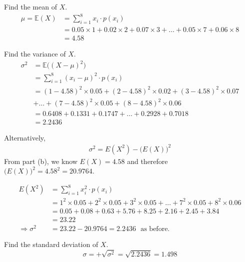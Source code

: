 \begin{example}
\begin{center}
\begin{benumerate}
\item Find the mean of $X$.
\begin{align*}
\mu = \mathbb{E}(X) &= \sum_{i=1}^{8} x_i \cdot p(x_i) \\
	&= 0.05 \times 1 + 0.02 \times 2 + 0.07 \times 3 + \hdots + 0.05 \times 7 + 0.06 \times 8 \\
	&= 4.58
\end{align*}

\item Find the variance of $X$.
\begin{align*}
\sigma^2 &= \mathbb{E} \bigg( (X-\mu)^2 \bigg) \\
		 &= \sum_{i=1}^{8} (x_i - \mu)^2 \cdot p(x_i) \\
		 &= (1-4.58)^2 \times 0.05 + (2-4.58)^2 \times 0.02 + (3 - 4.58)^2 \times 0.07 \\
		 &+ \hdots + (7-4.58)^2 \times 0.05 + (8-4.58)^2 \times 0.06 \\
		 &= 0.6408 + 0.1331 + 0.1747 + \hdots + 0.2928 + 0.7018 \\
		 &= 2.2436
\end{align*}

Alternatively,
\begin{align*}
\sigma^{2} = E(X^2) - \bigg( E(X) \bigg) ^2 
\end{align*}
From part (b), we know $E(X)=4.58$ and therefore $\bigg(E(X)\bigg)^2 = 4.58^2 = 20.9764$.

\begin{align*}
E(X^2) 	&= \sum_{i=1}^{8} x_i^2 \cdot p(x_i) \\
		&= 1^2 \times 0.05 + 2^2 \times 0.05 + 3^2 \times 0.05 + \hdots + 7^2 \times 0.05 + 8^2 \times 0.06 \\
		&= 0.05 + 0.08 + 0.63 + 5.76 + 8.25 + 2.16 + 2.45  + 3.84 \\
		&= 23.22 \\
\Rightarrow \sigma^2 &= 23.22 - 20.9764 = 2.2436 \text{~ as before.}
\end{align*}
\item Find the standard deviation of $X$.
\[ \sigma = +\sqrt{\sigma^{2}} = \sqrt{2.2436} = 1.498 \]

\end{benumerate}

\end{center}

\end{example}

